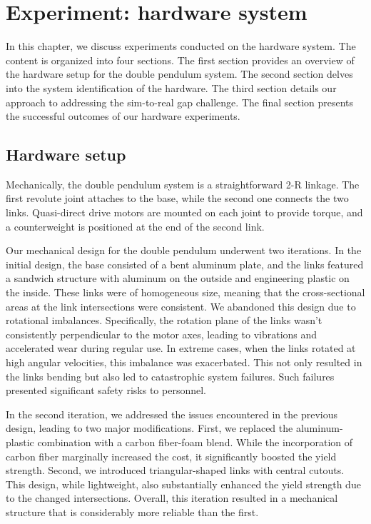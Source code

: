 \chapter{Experiment: hardware system}
In this chapter, we discuss experiments conducted on the hardware system. The content is organized into four sections. The first section provides an overview of the hardware setup for the double pendulum system. The second section delves into the system identification of the hardware. The third section details our approach to addressing the sim-to-real gap challenge. The final section presents the successful outcomes of our hardware experiments.

\section{Hardware setup}
Mechanically, the double pendulum system is a straightforward 2-R linkage. The first revolute joint attaches to the base, while the second one connects the two links. Quasi-direct drive motors are mounted on each joint to provide torque, and a counterweight is positioned at the end of the second link.

Our mechanical design for the double pendulum underwent two iterations. In the initial design, the base consisted of a bent aluminum plate, and the links featured a sandwich structure with aluminum on the outside and engineering plastic on the inside. These links were of homogeneous size, meaning that the cross-sectional areas at the link intersections were consistent. We abandoned this design due to rotational imbalances. Specifically, the rotation plane of the links wasn't consistently perpendicular to the motor axes, leading to vibrations and accelerated wear during regular use. In extreme cases, when the links rotated at high angular velocities, this imbalance was exacerbated. This not only resulted in the links bending but also led to catastrophic system failures. Such failures presented significant safety risks to personnel.

In the second iteration, we addressed the issues encountered in the previous design, leading to two major modifications. First, we replaced the aluminum-plastic combination with a carbon fiber-foam blend. While the incorporation of carbon fiber marginally increased the cost, it significantly boosted the yield strength. Second, we introduced triangular-shaped links with central cutouts. This design, while lightweight, also substantially enhanced the yield strength due to the changed intersections. Overall, this iteration resulted in a mechanical structure that is considerably more reliable than the first.

